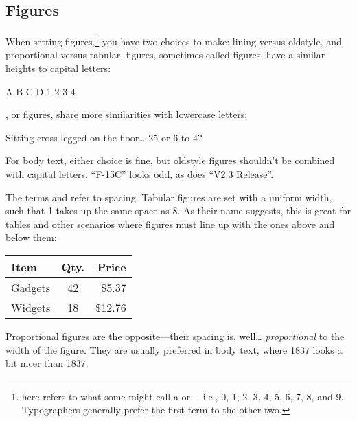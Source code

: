 \subsection{Figures}

When setting figures,\punckern\footnote{
here refers to what some might call a  or
---i.e., 0, 1, 2, 3, 4, 5, 6, 7, 8, and 9.
Typographers generally prefer the first term to the other two.}
you have two
choices to make: lining versus oldstyle,
and proportional versus tabular.
 figures, sometimes called  figures,
have a similar heights to capital letters:
\begin{leftfigure}
A B C D 1 2 3 4
\end{leftfigure}
, or  figures,
share more similarities with lowercase letters:
\begin{leftfigure}
Sitting cross-legged on the floor\ldots{} 25 or 6 to 4?
\end{leftfigure}
For body text, either choice is fine, but oldstyle figures shouldn't
be combined with capital letters.
``F-15C'' looks odd, as does ``V2.3 Release''\quotekern.

{
The terms  and  refer to spacing.
Tabular figures are set with a uniform width, such that 1 takes up
the same space as 8.
As their name suggests, this is great for tables and other scenarios
where figures must line up with the ones above and below them:}
\begin{leftfigure}
\begin{tabular}{l|c r}
Item & Qty. & Price \\
\hline
Gadgets & 42 & \$5.37 \\
Widgets & 18 & \$12.76 \\
\end{tabular}
\end{leftfigure}
Proportional figures are the opposite---their spacing is, well\ldots{}
\emph{proportional} to the width of the figure.
They are usually preferred in body text, where 1837
looks a bit nicer than
{1837}.

